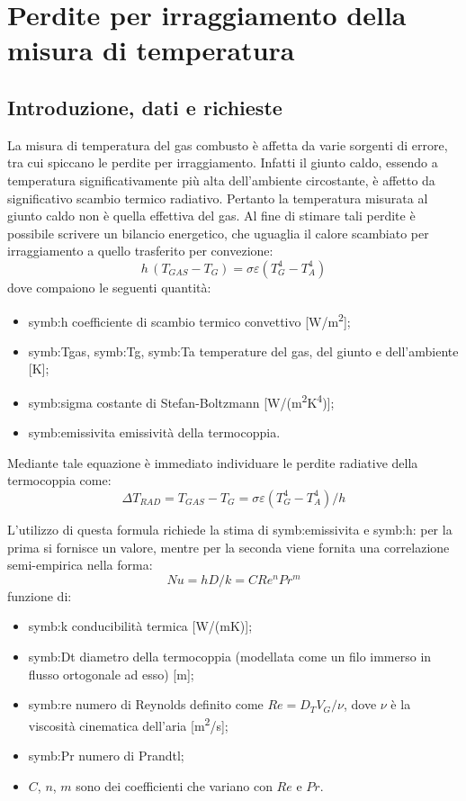 \section{Perdite per irraggiamento della misura di temperatura}
\subsection{Introduzione, dati e richieste}
La misura di temperatura del gas combusto è affetta da varie sorgenti di errore, tra cui spiccano le perdite per irraggiamento. 
Infatti il giunto caldo, essendo a temperatura significativamente più alta dell'ambiente circostante, è affetto da significativo scambio termico radiativo. Pertanto la temperatura misurata al giunto caldo non è quella effettiva del gas. 
Al fine di stimare tali perdite è possibile scrivere un bilancio energetico, che uguaglia il calore scambiato per irraggiamento a quello trasferito per convezione: 
\begin{equation}
	h \,(T_{\textit{GAS}}-T_G) = \sigma \varepsilon (T_G^4-T_A^4)
\end{equation}
dove compaiono le seguenti quantità:
\begin{itemize}
	\item \gls{symb:h} coefficiente di scambio termico convettivo [W/m\textsuperscript{2}];
	\item \gls{symb:Tgas}, \gls{symb:Tg}, \gls{symb:Ta} temperature del gas, del giunto e dell'ambiente [K];
	\item \gls{symb:sigma} costante di Stefan-Boltzmann [W/(m\textsuperscript{2}K\textsuperscript{4})];
	\item \gls{symb:emissivita} emissività della termocoppia.
\end{itemize}

Mediante tale equazione è immediato individuare le perdite radiative della termocoppia come:
\begin{equation}
	\Delta T_{\textit{RAD}} = T_{\textit{GAS}} -T_G = \sigma \varepsilon (T_G^4-T_A^4) / h \label{eq:deltaT}
\end{equation}

L'utilizzo di questa formula richiede la stima di \gls{symb:emissivita} e \gls{symb:h}: per la prima si fornisce un valore, mentre per la seconda viene fornita una correlazione semi-empirica nella forma:
\begin{equation}
	Nu = hD/k = CRe^nPr^m
\end{equation}
funzione di:
\begin{itemize}
	\item \gls{symb:k} conducibilità termica [W/(mK)];
	\item \gls{symb:Dt} diametro della termocoppia (modellata come un filo immerso in flusso ortogonale ad esso) [m];
	\item \gls{symb:re} numero di Reynolds definito come $Re = D_T V_G/\nu$, dove $\nu$ è la viscosità cinematica dell'aria [m\textsuperscript{2}/s];
	\item \gls{symb:Pr} numero di Prandtl;
	\item $C$, $n$, $m$ sono dei coefficienti che variano con $Re$ e $Pr$.
\end{itemize}

